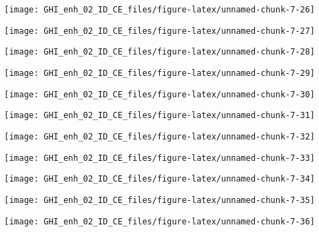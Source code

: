 \documentclass[
  10pt,
  a4paper,oneside]{article}
\begin{document}
\begin{center}\texttt{[image: GHI\_enh\_02\_ID\_CE\_files/figure-latex/unnamed-chunk-7-26]} \end{center}

\begin{center}\texttt{[image: GHI\_enh\_02\_ID\_CE\_files/figure-latex/unnamed-chunk-7-27]} \end{center}

\begin{center}\texttt{[image: GHI\_enh\_02\_ID\_CE\_files/figure-latex/unnamed-chunk-7-28]} \end{center}

\begin{center}\texttt{[image: GHI\_enh\_02\_ID\_CE\_files/figure-latex/unnamed-chunk-7-29]} \end{center}

\begin{center}\texttt{[image: GHI\_enh\_02\_ID\_CE\_files/figure-latex/unnamed-chunk-7-30]} \end{center}

\begin{center}\texttt{[image: GHI\_enh\_02\_ID\_CE\_files/figure-latex/unnamed-chunk-7-31]} \end{center}

\begin{center}\texttt{[image: GHI\_enh\_02\_ID\_CE\_files/figure-latex/unnamed-chunk-7-32]} \end{center}

\begin{center}\texttt{[image: GHI\_enh\_02\_ID\_CE\_files/figure-latex/unnamed-chunk-7-33]} \end{center}

\begin{center}\texttt{[image: GHI\_enh\_02\_ID\_CE\_files/figure-latex/unnamed-chunk-7-34]} \end{center}

\begin{center}\texttt{[image: GHI\_enh\_02\_ID\_CE\_files/figure-latex/unnamed-chunk-7-35]} \end{center}

\begin{center}\texttt{[image: GHI\_enh\_02\_ID\_CE\_files/figure-latex/unnamed-chunk-7-36]} \end{center}
\end{document}
